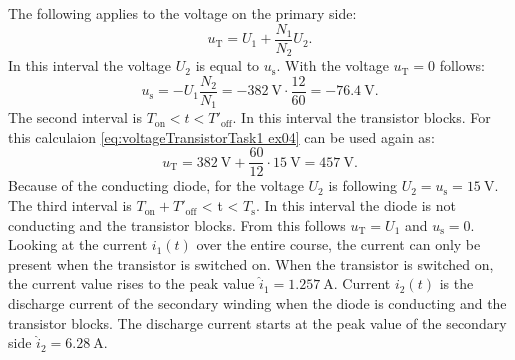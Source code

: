\begin{solutionblock}
    The following applies to the voltage on the primary side:
    \begin{equation}
        u_\mathrm{T} = U_1 + \frac{N_1}{N_2}U_\mathrm{2}.\label{eq:voltageTransistorTask1 ex04}
    \end{equation}
    In this interval the voltage $U_\mathrm{2}$ is equal to $u_\mathrm{s}$. With the voltage $u_\mathrm{T}=0$ follows:
    \begin{equation}
        u_\mathrm{s} = -U_1 \frac{N_2}{N_1} = -\SI{382}{\volt}\cdot\frac{12}{60} = \SI{-76.4}{\volt}.
    \end{equation}
    The second interval is $T_\mathrm{on} < t < T'_\mathrm{off}$. In this interval the transistor blocks. For this calculaion \eqref{eq:voltageTransistorTask1 ex04} can be used again as:
    \begin{equation}
        u_\mathrm{T} = \SI{382}{\volt} + \frac{60}{12}\cdot\SI{15}{\volt} = \SI{457}{\volt}.
    \end{equation}
    Because of the conducting diode, for the voltage $U_\mathrm{2}$ is following $U_\mathrm{2} = u_\mathrm{s} = \SI{15}{\volt}$.
    The third interval is $T_\mathrm{on}+T'_\mathrm{off}$ < t < $T_\mathrm{s}$. In this interval the diode is not conducting and the transistor blocks. From this follows $u_\mathrm{T} = U_1$ and $u_\mathrm{s}=0$.
    Looking at the current $i_\mathrm{1}(t)$ over the entire course, the current can only be present when the transistor is switched on. When the transistor is switched on, the current value rises to the peak value $\hat i_\mathrm{1}= \SI{1.257}{\ampere}$. Current $i_\mathrm{2}(t)$ is the discharge current of the secondary winding when the diode is conducting and the transistor blocks. The discharge current starts at the peak value of the secondary side $\hat i_\mathrm{2}= \SI{6.28}{\ampere}$.
    
    
\end{solutionblock}


